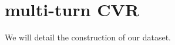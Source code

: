 \section{multi-turn CVR}
\label{sec:intro}

We will detail the construction of our \Mybenchmark dataset.



